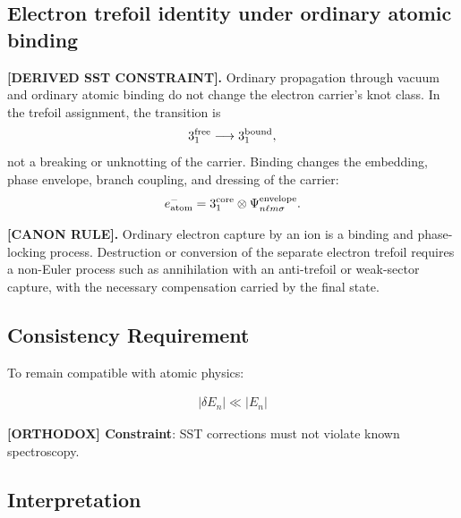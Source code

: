 \documentclass[11pt]{article}
\theoremstyle{definition}
\theoremstyle{plain}
\theoremstyle{remark}
\begin{document}
    \subsection{Electron trefoil identity under ordinary atomic binding}
        \label{subsec:electron_trefoil_atomic_binding}

        \textbf{[DERIVED SST CONSTRAINT].}
        Ordinary propagation through vacuum and ordinary atomic binding do not
        change the electron carrier's knot class. In the trefoil assignment, the
        transition is
        \begin{align}
            3_1^{\rm free}
            \longrightarrow
            3_1^{\rm bound},
            \label{eq:free_to_bound_trefoil}
        \end{align}
        not a breaking or unknotting of the carrier. Binding changes the embedding,
        phase envelope, branch coupling, and dressing of the carrier:
        \begin{align}
            e^-_{\rm atom}
            =
            3_1^{\rm core}
            \otimes
            \Psi_{n\ell m\sigma}^{\rm envelope}.
            \label{eq:atomic_electron_trefoil_tensor_envelope}
        \end{align}

        \textbf{[CANON RULE].}
        Ordinary electron capture by an ion is a binding and phase-locking process.
        Destruction or conversion of the separate electron trefoil requires a
        non-Euler process such as annihilation with an anti-trefoil or weak-sector
        capture, with the necessary compensation carried by the final state.

    \subsection{Consistency Requirement}
        
        To remain compatible with atomic physics:
        
        \begin{align}
            |\delta E_n| \ll |E_n|
        \end{align}
        
        \textbf{[ORTHODOX] Constraint}: SST corrections must not violate known spectroscopy.
    
    \subsection{Interpretation}
        
\end{document}

